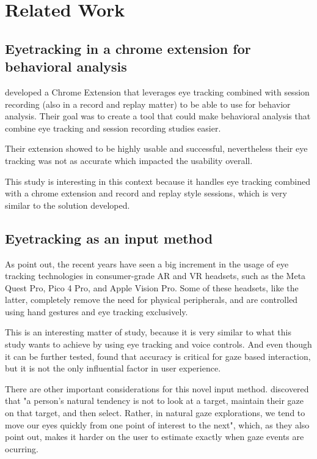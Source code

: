 \section{Related Work}

\subsection{Eyetracking in a chrome extension for behavioral analysis}

\cite{art:behavioral-analysis-2024} developed a Chrome Extension that leverages eye tracking combined with session recording (also in a record and replay matter) to be able to use for behavior analysis. Their goal was to create a tool that could make behavioral analysis that combine eye tracking and session recording studies easier.

Their extension showed to be highly usable and successful, nevertheless their eye tracking was not as accurate which impacted the usability overall.

This study is interesting in this context because it handles eye tracking combined with a chrome extension and record and replay style sessions, which is very similar to the solution developed.

\subsection{Eyetracking as an input method}

As \cite{art:avp-2024} point out, the recent years have seen a big increment in the usage of eye tracking technologies in consumer-grade AR and VR headsets, such as the Meta Quest Pro, Pico 4 Pro, and Apple Vision Pro. Some of these headsets, like the latter, completely remove the need for physical peripherals, and are controlled using hand gestures and eye tracking exclusively. 

This is an interesting matter of study, because it is very similar to what this study wants to achieve by using eye tracking and voice controls. And even though it can be further tested, \citep{art:avp-2024} found that accuracy is critical for gaze based interaction, but it is not the only influential factor in user experience. 

There are other important considerations for this novel input method. \citep{art:meta-studies-2023} discovered that "a person's natural tendency is not to look at a target, maintain their gaze on that target, and then select. Rather, in natural gaze explorations, we tend to move our eyes quickly from one point of interest to the next", which, as they also point out, makes it harder on the user to estimate exactly when gaze events are ocurring.

